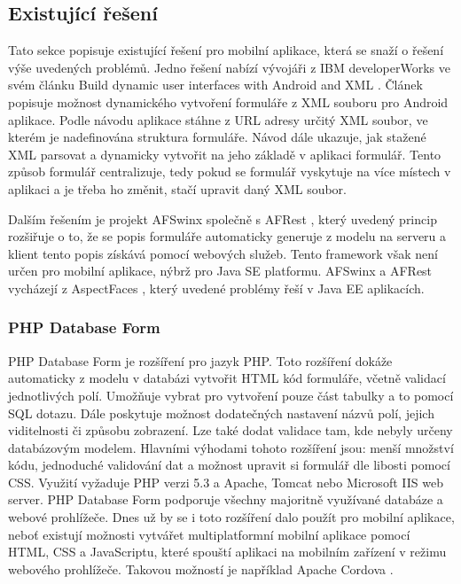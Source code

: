 \subsection{Existující řešení}
Tato sekce popisuje existující řešení pro mobilní aplikace, která se snaží o řešení výše uvedených problémů. Jedno řešení nabízí vývojáři z IBM developerWorks ve svém článku Build dynamic user interfaces with Android and XML \cite{dynamic-android-xml}. Článek popisuje možnost dynamického vytvoření formuláře z XML souboru pro Android aplikace. Podle návodu aplikace stáhne z URL adresy určitý XML soubor, ve kterém je nadefinována struktura formuláře. Návod dále ukazuje, jak stažené XML parsovat a dynamicky vytvořit na jeho základě v aplikaci formulář. Tento způsob formulář centralizuje, tedy pokud se formulář vyskytuje na více místech v aplikaci a je třeba ho změnit, stačí upravit daný XML soubor.

Dalším řešením je projekt AFSwinx společně s AFRest \cite{tomasek-thesis}, který uvedený princip rozšiřuje o to, že se popis formuláře automaticky generuje z modelu na serveru a klient tento popis získává pomocí webových služeb. Tento framework však není určen pro mobilní aplikace, nýbrž pro Java SE platformu. AFSwinx a AFRest vycházejí z AspectFaces \cite{aspect-faces}, který  uvedené problémy řeší v Java EE aplikacích.

\subsubsection{PHP Database Form}
PHP Database Form \cite{phpdbform} je rozšíření pro jazyk PHP. Toto rozšíření dokáže automaticky z modelu v databázi vytvořit HTML kód formuláře, včetně validací jednotlivých polí. Umožňuje vybrat pro vytvoření pouze část tabulky a to pomocí SQL dotazu. Dále poskytuje možnost dodatečných nastavení názvů polí, jejich viditelnosti či způsobu zobrazení. Lze také dodat validace tam, kde nebyly určeny databázovým modelem. Hlavními výhodami tohoto rozšíření jsou: menší množství kódu, jednoduché validování dat a možnost upravit si formulář dle libosti pomocí CSS. Využití vyžaduje PHP verzi 5.3 a Apache, Tomcat nebo Microsoft IIS web server. PHP Database Form podporuje všechny majoritně využívané databáze a webové prohlížeče. Dnes už by se i toto rozšíření dalo použít pro mobilní aplikace, neboť existují možnosti vytvářet multiplatformní mobilní aplikace pomocí HTML, CSS a JavaScriptu, které spouští aplikaci na mobilním zařízení v režimu webového prohlížeče. Takovou možností je například Apache Cordova \cite{apache-cordova}.

